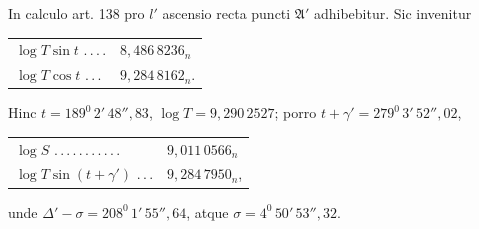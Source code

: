 In calculo art. 138 pro $l'$ ascensio recta puncti $\mathfrak A'$ adhibebitur. Sic invenitur
\begin{center}\begin{tabular}{ll}
$\log T\sin t$ .\,.\,.\,. & $8{,}486\,8236_n$\\
$\log T\cos t$ .\,.\,. & $9{,}284\,8162_n$.
\end{tabular}\end{center}
\noindent Hinc $t=189^0\,2'\,48''{,}83$, $\log T=9{,}290\,2527$; porro $t+\gamma'=279^0\,3'\,52''{,}02$,
\begin{center}\begin{tabular}{ll}
$\log S$ .\,.\,.\,.\,.\,.\,.\,.\,.\,.\,. & $9{,}011\,0566_n$\\
$\log T\sin(t+\gamma')$ .\,.\,. & $9{,}284\,7950_n$,
\end{tabular}\end{center}
\noindent unde $\Delta'-\sigma=208^0\,1'\,55''{,}64$, atque $\sigma=4^0\,50'\,53''{,}32$.

